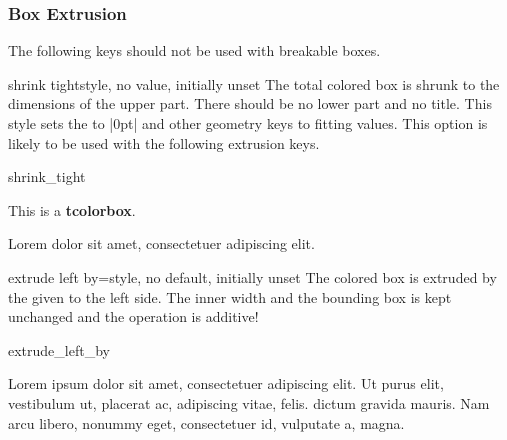 \clearpage
\subsubsection{Box Extrusion}

\begin{marker}
The following keys should not be used with breakable boxes.
\end{marker}

\begin{docTcbKey}{shrink tight}{}{style, no value, initially unset}
  The total colored box is shrunk to the dimensions of the upper
  part. There should be no lower part and no title.
  This style sets the  to |0pt| and other geometry keys
  to fitting values. This option is likely to be used with the following
  extrusion keys.
\begin{exdispExample}{shrink_tight}

\begin{tcolorbox}
This is a \textbf{tcolorbox}.
\end{tcolorbox}

Lorem  dolor sit amet, consectetuer adipiscing elit.
\end{exdispExample}
\end{docTcbKey}

\begin{docTcbKey}[][doc updated=2014-09-19]{extrude left by}{=}{style, no default, initially unset}
  The colored box is extruded by the given  to the left side.
  The inner width and the bounding box is kept unchanged and the operation
  is additive!
\begin{exdispExample}{extrude_left_by}

Lorem ipsum dolor sit amet, consectetuer adipiscing elit. Ut purus elit,
vestibulum ut, placerat ac, adipiscing vitae, felis.
 dictum gravida mauris.
Nam arcu libero, nonummy eget, consectetuer id, vulputate a, magna.
\end{exdispExample}
\end{docTcbKey}

